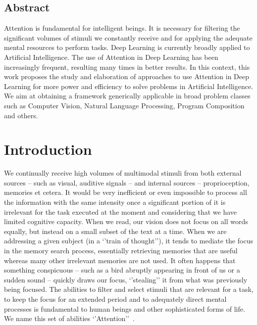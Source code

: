 \documentclass[English]{style/ic-tese-v3}
\begin{document}


\paginasiniciais
\section*{Abstract}
Attention is fundamental for intelligent beings.
It is necessary for filtering the significant volumes of stimuli we constantly receive
and for applying the adequate mental resources to perform tasks.
Deep Learning is currently broadly applied to Artificial Intelligence.
The use of Attention in Deep Learning has been increasingly frequent,
resulting many times in better results.
In this context, this work proposes the study and elaboration of approaches to use Attention in Deep Learning
for more power and efficiency to solve problems in Artificial Intelligence.
We aim at obtaining a framework generically applicable in broad problem classes
such as Computer Vision, Natural Language Processing, Program Composition and others.
\fimdaspaginasiniciais


\chapter{Introduction}
We continually receive high volumes of multimodal stimuli from both external sources
-- such as visual, auditive signals -- and internal sources -- proprioception, memories et cetera.
It would be very inefficient or even impossible to process all the information with
the same intensity once a significant portion of it is irrelevant for
the task executed at the moment and considering that we have limited cognitive capacity.
When we read, our vision does not focus on all
words equally, but instead on a small subset of the text at a time.
When we are addressing a given subject (in a `'train of thought''), it tends to mediate the focus
in the memory search process, essentially retrieving memories that
are useful whereas many other irrelevant memories are not used.
It often happens that something conspicuous
-- such as a bird abruptly appearing in front of us or a sudden sound --
quickly draws our focus, `'stealing'' it from what was previously being focused.
The abilities to filter and select stimuli that are relevant for a task, to keep the focus for an
extended period and to adequately direct mental processes is fundamental to
human beings and other sophisticated forms of life.
We name this set of abilities `'Attention''~\cite{ref:esther-thesis}.
\end{document}
